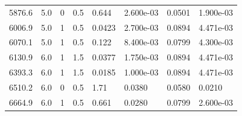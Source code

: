 \documentclass[preview]{standalone}
\begin{document}
{{\begin{tabular}{L{1.2cm}C{1.2cm} C{0.3cm}C{0.5cm} C{1.4cm}C{1.4cm} C{1.4cm}C{1.4cm}}
  5876.6  &   5.0  & 0     & 0.5 &  0.644  & 2.600e-03  & 0.0501 &  1.900e-03   \\ 
  6006.9  &   5.0  & 1     & 0.5 &  0.0423  & 2.700e-03  & 0.0894 &  4.471e-03   \\ 
  6070.1  &   5.0  & 1     & 0.5 &  0.122  & 8.400e-03  & 0.0799 &  4.300e-03   \\ 
  6130.9  &   6.0  & 1     & 1.5 &  0.0377  & 1.750e-03  & 0.0894 &  4.471e-03   \\ 
  6393.3  &   6.0  & 1     & 1.5 &  0.0185  & 1.000e-03  & 0.0894 &  4.471e-03   \\ 
  6510.2  &   6.0  & 0     & 0.5 &  1.71  & 0.0380  & 0.0580 &  0.0210   \\ 
  6664.9  &   6.0  & 1     & 0.5 &  0.661  & 0.0280  & 0.0799 &  2.600e-03   \\ 
\hline 
\end{tabular} 

}}
\end{document}

